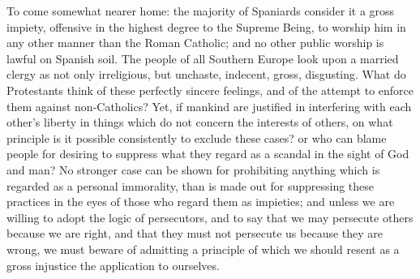 \documentclass[11pt,openany]{book}
\begin{document}
To come somewhat nearer home: the majority of Spaniards consider it a gross impiety, offensive in the highest degree to the Supreme Being, to worship him in any other manner than the Roman Catholic; and no other public worship is lawful on Spanish soil. The people of all Southern Europe look upon a married clergy as not only irreligious, but unchaste, indecent, gross, disgusting. What do Protestants think of these perfectly sincere feelings, and of the attempt to enforce them against non-Catholics? Yet, if mankind are justified in interfering with each other's liberty in things which do not concern the interests of others, on what principle is it possible consistently to exclude these cases? or who can blame people for desiring to suppress what they regard as a scandal in the sight of God and man? No stronger case can be shown for prohibiting anything which is regarded as a personal immorality, than is made out for suppressing these practices in the eyes of those who regard them as impieties; and unless we are willing to adopt the logic of persecutors, and to say that we may persecute others because we are right, and that they must not persecute us because they are wrong, we must beware of admitting a principle of which we should resent as a gross injustice the application to ourselves.
\end{document}
